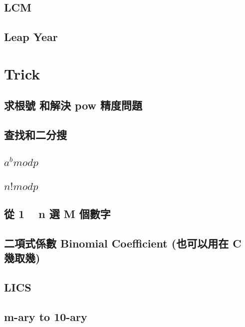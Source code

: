     \subsection{LCM}
        
    \subsection{Leap Year}
        


\section{Trick}
    \subsection{求根號 和解決 pow 精度問題}
        
    \subsection{查找和二分搜}
        
    \subsection{$a^b mod p$}
         
    \subsection{$n! mod p$}
         
    \subsection{從 1 ~ n 選 M 個數字}
        
    \subsection{二項式係數 Binomial Coefficient (也可以用在 C 幾取幾)}
        
    \subsection{LICS}
        
    \subsection{m-ary to 10-ary}
        